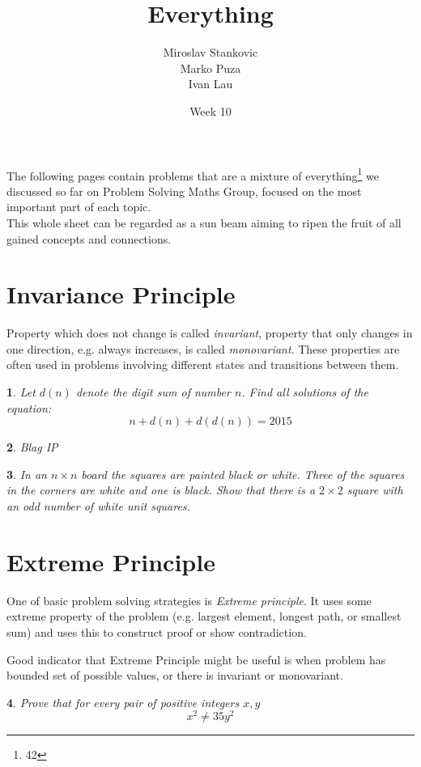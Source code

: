 \documentclass[12pt]{article}
\title{\textbf{Everything}}
\date{Week 10}
\author{Miroslav Stankovic\\ Marko Puza\\ Ivan Lau\\}
\newtheorem{problem}{}
\begin{document}
\maketitle

\noindent The following pages contain problems that are a mixture of everything\footnote{42} we discussed so far on Problem Solving Maths Group, focused on the most important part of each topic.\\
This whole sheet can be regarded as a sun beam aiming to ripen the fruit of all gained concepts and connections.

\section{Invariance Principle}
Property which does not change is called \emph{invariant}, property that only changes in one direction, e.g. always increases, is called \emph{monovariant}. These properties are often used in problems involving different states and transitions between them. 

\begin{problem}
Let $d(n)$ denote the digit sum of number $n$. Find all solutions of the equation: \[n + d(n) + d(d(n)) = 2015\]
\end{problem}

\begin{problem}
Blag IP \end{problem}

\begin{problem}
In an $n \times n$ board the squares are painted black or white. Three of the squares in the corners are white and one is black. Show that there is a $2 \times 2$ square with an odd number of white unit squares.
 \end{problem}

\section{Extreme Principle}

One of basic problem solving strategies is \emph{Extreme principle}. It uses some extreme property of the problem (e.g. largest element, longest path, or smallest sum) and uses this to construct proof or show contradiction. 

Good indicator that Extreme Principle might be useful is when problem has bounded set of possible values, or there is invariant or monovariant.

\begin{problem}
Prove that for every pair of positive integers $x, y$ \[x^2 \ne 35 y^2\]
\end{problem}
\end{document}
